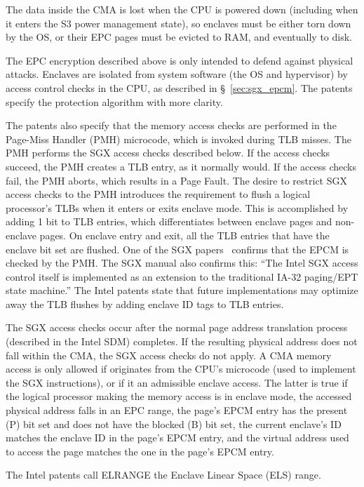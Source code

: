 The data inside the CMA is lost when the CPU is powered down (including when it
enters the S3 power management state), so enclaves must be either torn down by
the OS, or their EPC pages must be evicted to RAM, and eventually to disk.

The EPC encryption described above is only intended to defend against physical
attacks. Enclaves are isolated from system software (the OS and hypervisor) by
access control checks in the CPU, as described in \S~\ref{sec:sgx_epcm}. The
patents specify the protection algorithm with more clarity.

The patents also specify that the memory access checks are performed in the
Page-Miss Handler (PMH) microcode, which is invoked during TLB misses. The PMH
performs the SGX access checks described below. If the access checks succeed,
the PMH creates a TLB entry, as it normally would. If the access checks fail,
the PMH aborts, which results in a Page Fault. The desire to restrict SGX
access checks to the PMH introduces the requirement to flush a logical
processor's TLBs when it enters or exits enclave mode. This is accomplished by
adding 1 bit to TLB entries, which differentiates between enclave pages and
non-enclave pages.
On enclave entry and exit, all the TLB entries that have the enclave bit set
are flushed. One of the SGX papers~\cite{mckeen2013sgx} confirms that the EPCM
is checked by the PMH.
The SGX manual also confirms this: ``The Intel SGX access control itself is
implemented as an extension to the traditional IA-32 paging/EPT state
machine.''
The Intel patents state that future implementations may optimize away the TLB
flushes by adding enclave ID tags to TLB entries.

The SGX access checks occur after the normal page address translation process
(described in the Intel SDM) completes.
If the resulting physical address does not fall within the CMA, the
SGX access checks do not apply.
A CMA memory access is only allowed if originates from the CPU's microcode
(used to implement the SGX instructions), or if it an admissible enclave
access.
The latter is true if the logical processor making the memory access is in
enclave mode, the accessed physical address falls in an EPC range, the page's
EPCM entry has the present (P) bit set and does not have the blocked (B) bit
set, the current enclave's ID matches the enclave ID in the page's EPCM entry,
and the virtual address used to access the page matches the one in the page's
EPCM entry.

The Intel patents call ELRANGE the Enclave Linear Space (ELS) range.



